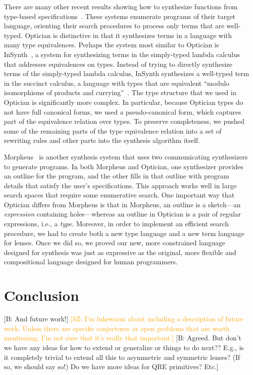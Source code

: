\documentclass[acmsmall,review,anonymous]{acmart}
\newcommand{\FINISH}[3]{\ifdraft\textcolor{#1}{[#2: #3]}\fi}
\newcommand{\bcp}[1]{\FINISH{dkred}{B}{#1}}
\newcommand{\saz}[1]{\FINISH{orange}{SZ}{#1}}
\begin{document}
There are many other recent results showing how to synthesize functions from
type-based
specifications~\cite{augustsson-2004,osera+:pldi15,feser-pldi-2015,scherer-icfp-2015,frankle+:popl16,armando+:pldi16}.
These systems enumerate programs of their target language, orienting their
search procedures to process only terms that are well-typed.
Optician is distinctive in that it synthesizes terms in a language with many
type equivalences.
Perhaps the system most similar to Optician is InSynth~\cite{gvero-pldi-2013}, a
system for synthesizing terms in the simply-typed lambda calculus that addresses
equivalences on types. Instead of trying to directly synthesize terms of the
simply-typed lambda calculus, InSynth synthesizes a well-typed term
in the succinct calculus, a language with types
that are equivalent ``modulo isomorphisms of products and
currying''~\cite{gvero-pldi-2013}. The type structure that we used in Optician
is significantly more complex.  In particular, because Optician types do not
have full canonical forms, we used a pseudo-canonical form, which captures part
of the equivalence relation over types. To preserve completeness, we pushed
some of the remaining parts of the type equivalence relation into a set of
rewriting rules and other parts into the synthesis algorithm itself.

Morpheus~\cite{morpheus} is another synthesis system that uses two
communicating synthesizers to generate programs.  In both Morpheus and
Optician, one synthesizer provides an
outline for the program, and the other fills in that outline with program
details that satisfy the user's specifications.
This approach works well in large search spaces that require some enumerative
search.
One important way that Optician differs from Morpheus is that in
Morpheus, an outline is a sketch---an
\emph{expression}
containing holes---whereas
an outline in Optician is a pair of regular
expressions, i.e., a
\emph{type}.  Moreover, in order to implement an efficient
search procedure, we had to create both a new type language and a new
term language for lenses.  Once we did so, we proved our new, more
constrained language
designed for synthesis was just as expressive as the original, more
flexible and compositional language designed for human programmers.

\section{Conclusion}
\bcp{And future work!}  \saz{I'm lukewarm about including a description of
future work.  Unless there are specific conjectures or open problems that
are worth mentioning, I'm not sure that it's really that important.}
\bcp{Agreed. But don't we have any ideas for how to extend or generalize or
things to do next??  E.g., is it completely trivial to extend all this to
asymmetric and symmetric lenses?  (If so, we should say so!)  Do we have
more ideas for QRE primitives?  Etc.}
\label{concl}
\end{document}
